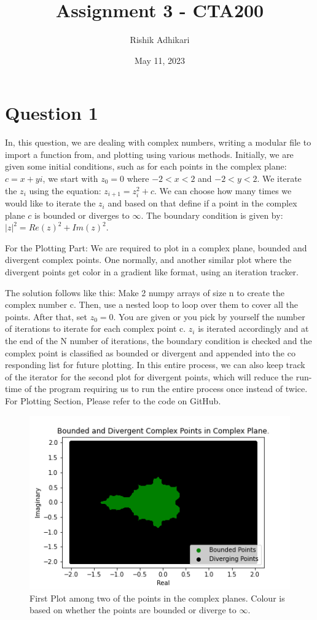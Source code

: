 \documentclass{article}
\title{Assignment 3 - CTA200}
\author{Rishik Adhikari}
\date{May 11, 2023}
\begin{document}
\maketitle

\section*{Question 1}

In, this question, we are dealing with complex numbers, writing a modular file to import a function from, and plotting using various methods. Initially, we are given some initial conditions, such as for each points in the complex plane: $c = x + yi$, we start with $z_0 = 0$ where $-2 < x < 2$ and $-2 < y < 2$. We iterate the $z_i$ using the equation: $z_{i + 1} = z_i^2 + c$. We can choose how many times we would like to iterate the $z_i$ and based on that define if a point in the complex plane $c$ is bounded or diverges to $\infty$. The boundary condition is given by: $|z|^2 = Re(z)^2 + Im(z)^2$.

For the Plotting Part: We are required to plot in a complex plane, bounded and divergent complex points. One normally, and another similar plot where the divergent points get color in a gradient like format, using an iteration tracker.  

The solution follows like this: 
Make 2 numpy arrays of size n to create the complex number c. Then, use a nested loop to loop over them to cover all the points. After that, set $z_0 = 0 $. You are given or you pick by yourself the number of iterations to iterate for each complex point c. $z_i$ is iterated accordingly and at the end of the N number of iterations, the boundary condition is checked and the complex point is classified as bounded or divergent and appended into the co responding list for future plotting. 
In this entire process, we can also keep track of the iterator for the second plot for divergent points, which will reduce the run-time of the program requiring us to run the entire process once instead of twice. 
\\
For Plotting Section, Please refer to the code on GitHub.

\begin{figure}[!htb]
    \centering
    \includegraphics[scale=0.7]{q1_1.png}
    \caption{ First Plot among two of the points in the complex planes. Colour is based on whether the points are bounded or diverge to $\infty$.}
    \label{fig:q1_1.png}
\end{figure}
\end{document}
